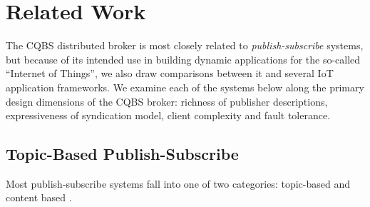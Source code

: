 \section{Related Work}

The CQBS distributed broker is most closely related to \emph{publish-subscribe} systems, but because of its intended use in building dynamic applications for the so-called ``Internet of Things'', we also draw comparisons between it and several IoT application frameworks. We examine each of the systems below along the primary design dimensions of the CQBS broker: richness of publisher descriptions, expressiveness of syndication model, client complexity and fault tolerance.

\subsection{Topic-Based Publish-Subscribe}

Most publish-subscribe systems fall into one of two categories: topic-based and content based \cite{eugster2003many}.

